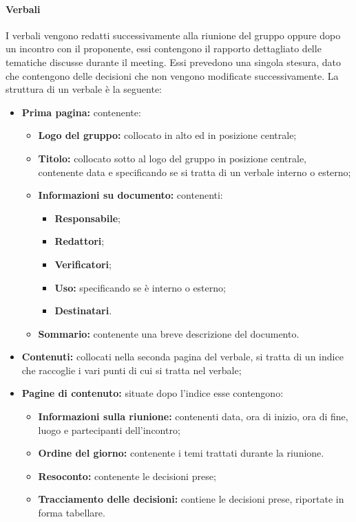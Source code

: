 \paragraph{Verbali}
I verbali vengono redatti successivamente alla riunione del gruppo oppure dopo un incontro con il proponente, essi contengono il rapporto dettagliato delle tematiche discusse durante il meeting. 
Essi prevedono una singola stesura, dato che contengono delle decisioni che non vengono modificate successivamente.
La struttura di un verbale è la seguente:
\begin {itemize}
    \item \textbf{Prima pagina:} contenente:
    \begin{itemize}
        \item \textbf{Logo del gruppo:} collocato in alto ed in posizione centrale;
        \item \textbf{Titolo:} collocato sotto al logo del gruppo in posizione centrale, contenente data e specificando se si tratta di un verbale interno o esterno;
        \item \textbf{Informazioni su documento:} contenenti:
        \begin{itemize}
            \item \textbf{Responsabile};
            \item \textbf{Redattori};
            \item \textbf{Verificatori};
            \item \textbf{Uso:} specificando se è interno o esterno;
            \item \textbf{Destinatari}.
        \end{itemize}
        \item \textbf{Sommario:} contenente una breve descrizione del documento.
    \end {itemize}
    \item \textbf{Contenuti:} collocati nella seconda pagina del verbale, si tratta di un indice che raccoglie i vari punti di cui si tratta nel verbale;
    \item \textbf{Pagine di contenuto:} situate dopo l'indice esse contengono:
    \begin {itemize}
        \item \textbf{Informazioni sulla riunione:} contenenti data, ora di inizio, ora di fine, luogo e partecipanti dell'incontro;
        \item \textbf{Ordine del giorno:} contenente i temi trattati durante la riunione.
        \item \textbf{Resoconto:} contenente le decisioni prese;
        \item \textbf{Tracciamento delle decisioni:} contiene le decisioni prese, riportate in forma tabellare.
    \end {itemize}
\end {itemize}
